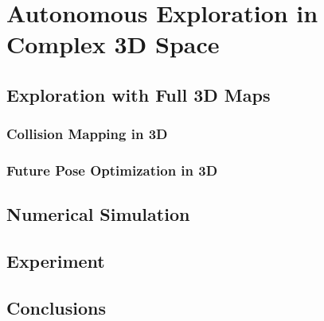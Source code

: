 
\chapter{Autonomous Exploration in Complex 3D Space} \label{chap:ae3Dcomplex}


\section{Exploration with Full 3D Maps}

\subsection{Collision Mapping in 3D}

\subsection{Future Pose Optimization in 3D}

\section{Numerical Simulation}

\section{Experiment}

\section{Conclusions}





